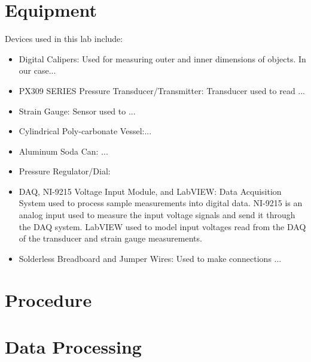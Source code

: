 \documentclass{article}
\begin{document}
\section{Equipment}
Devices used in this lab include:
\begin{itemize}

\item Digital Calipers: Used for measuring outer and inner dimensions of objects. In our case...
\vspace{2.5mm}

\item PX309 SERIES Pressure Transducer/Transmitter: Transducer used to read ...
\vspace{2.5mm}

\item Strain Gauge: Sensor used to ...
\vspace{2.5mm}

\item Cylindrical Poly-carbonate Vessel:...
\vspace{2.5mm}

\item Aluminum Soda Can: ... 
\vspace{2.5mm}

\item Pressure Regulator/Dial: 
\vspace{2.5mm}

\item DAQ, NI-9215 Voltage Input Module, and LabVIEW: Data Acquisition System used to process sample measurements into digital data. NI-9215 is an analog input used to measure the input voltage signals and send it through the DAQ system. LabVIEW used to model input voltages read from the DAQ of the transducer and strain gauge measurements.
\vspace{2.5mm}

\item Solderless Breadboard and Jumper Wires: Used to make connections ... 

\end{itemize}

\section{Procedure}

\section{Data Processing}
\end{document}
